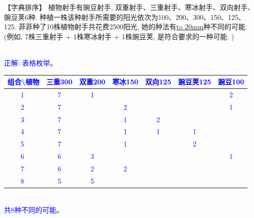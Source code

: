 \item {
    【字典排序】
    植物射手有豌豆射手, 双重射手、三重射手、寒冰射手、双向射手、豌豆荚6种. 种植一株该种射手所需要的阳光依次为100、200、300、150、125、125. 菲菲种了10株植物射手共花费2500阳光, 她的种法有\underline{\hbox to 20mm{}}种不同的可能.  (例如, 7株三重射手 + 1株寒冰射手 + 1株豌豆荚, 是符合要求的一种可能. )
    \ifshowSolution 
        \fangsong{}\textcolor{blue}{
            \\正解: 表格枚举。\\
            \begin{tabular}{|c|c|c|c|c|c|c|}
                \hline
                组合\textbackslash 植物 & 三重300 & 双重200 & 寒冰150 & 双向125 & 豌豆荚125 & 豌豆100 \\
                \hline
                \textcircled{1}&7&1&&&&2 \\
                \textcircled{2}&7&&2&&&1 \\
                \textcircled{3}&7&&1&2&& \\
                \textcircled{4}&7&&1&1&1& \\
                \textcircled{5}&7&&1&&2& \\
                \textcircled{6}&6&3&&&&1 \\
                \textcircled{7}&6&2&2&&& \\
                \textcircled{8}&5&5&&&& \\
                \hline
            \end{tabular} \\
            共8种不同的可能。
        }
    \else
        \vspace{1cm}
    \fi
}

